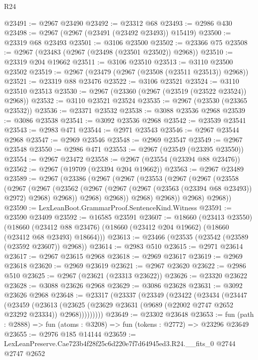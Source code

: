 \begin{lexlean}{R24}
\begin{coremodule}
@23491 := @2967 @23490
@23492 := @23312 @68
@23493 := @2986 @430
@23498 := @2967 (@2967 (@23491 (@23492 @23493)) @15419)
@23500 := @23319 @68 @23493
@23501 := @3106 @23500
@23502 := @23366 @75
@23508 := @2967 (@23483 (@2967 (@23498 (@23501 @23502)) @2968))
@23510 := @23319 @204 @19662
@23511 := @3106 @23510
@23513 := @3110 @23500 @23502
@23519 := @2967 (@23479 (@2967 (@23508 (@23511 @23513)) @2968))
@23521 := @23319 @88 @23476
@23522 := @3106 @23521
@23524 := @3110 @23510 @23513
@23530 := @2967 (@23360 (@2967 (@23519 (@23522 @23524)) @2968))
@23532 := @3110 @23521 @23524
@23535 := @2967 (@23530 (@23365 @23532))
@23536 := @23371 @23532
@23538 := @3088 @23536 @2968
@23539 := @3086 @23538
@23541 := @3092 @23536 @2968
@23542 := @23539 @23541
@23543 := @2983 @471
@23544 := @2971 @23543
@23546 := @2967 @23544 @2968
@23547 := @2969 @23546
@23548 := @2969 @23547
@23549 := @2967 @23548
@23550 := @2986 @471
@23553 := @2967 (@23549 (@23395 @23550))
@23554 := @2967 @23472
@23558 := @2967 (@23554 (@23394 @88 @23476))
@23562 := @2967 (@19709 (@23394 @204 @19662))
@23563 := @2967 @23489
@23589 := @2967
    (@23386
      (@2967
        (@2967
          (@23553
            (@2967
              (@2967
                (@23558
                  (@2967
                    (@2967
                      (@23562
                        (@2967 (@2967 (@2967 (@23563 (@23394 @68 @23493)) @2972) @2968) @2968))
                      @2968)
                    @2968))
                @2968)
              @2968))
          @2968)
        @2968))
@23590 := LexLeanBoot.GrammarProof.SentenceKind.Witness
@23591 := @23590 @23409
@23592 := @16585 @23591
@23607 := @18660
    (@23413 @23550)
    (@18660 (@23412 @88 @23476) (@18660 (@23412 @204 @19662) (@18660 (@23412 @68 @23493) @18664)))
@23613 := @23466 (@23535 (@23542 (@23589 (@23592 @23607)) @2968))
@23614 := @2983 @510
@23615 := @2971 @23614
@23617 := @2967 @23615 @2968
@23618 := @2969 @23617
@23619 := @2969 @23618
@23620 := @2969 @23619
@23621 := @2967 @23620
@23622 := @2986 @510
@23625 := @2967 (@23621 (@23313 @23622))
@23626 := @23320 @23622
@23628 := @3088 @23626 @2968
@23629 := @3086 @23628
@23631 := @3092 @23626 @2968
@23648 := @23317
    (@23337
      (@23349
        (@23422
          (@23434
            (@23447
              (@23459
                (@23613
                  (@23625 (@23629 @23631 (@9689 (@22002 @2747 @2652 @23292 @23334)) @2968)))))))))
@23649 := @23302 @23648
@23653 := fun (path : @2888) => fun (atoms : @3208) => fun (tokens : @2772) => @23296 @23649
@23655 := @2976 @185 @14144
@23659 := LexLeanPreserve.Cae723b4f28f25c6d220e7f7d64945ed3.R24.__fits_0 @2744 @2747 @2652

\end{coremodule}
\end{lexlean}
